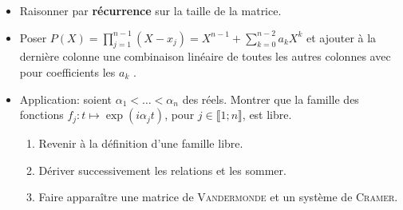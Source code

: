 \begin{itemize}
    \item Raisonner par \textbf{récurrence} sur la taille de la matrice. 
    \item Poser $\boxed{P(X)=\prod\limits_{j=1}^{n-1} (X-x_j) = X^{n-1} + \sum\limits_{k=0}^{n-2} a_k X^k}$ et ajouter à la dernière colonne une combinaison linéaire de toutes les autres colonnes avec pour coefficients les $a_k$ .
    \item Application: soient $\alpha_1 < \dots < \alpha_n$ des réels. Montrer que la famille des fonctions $f_j:t \mapsto \exp(i \alpha_j t)$, pour $j \in \llbracket 1; n \rrbracket$, est libre.
    \begin{enumerate}
        \item Revenir à la définition d'une famille libre.
        \item Dériver successivement les relations et les sommer. 
        \item Faire apparaître une matrice de \textsc{Vandermonde} et un système de \textsc{Cramer}. 
    \end{enumerate}
\end{itemize}
